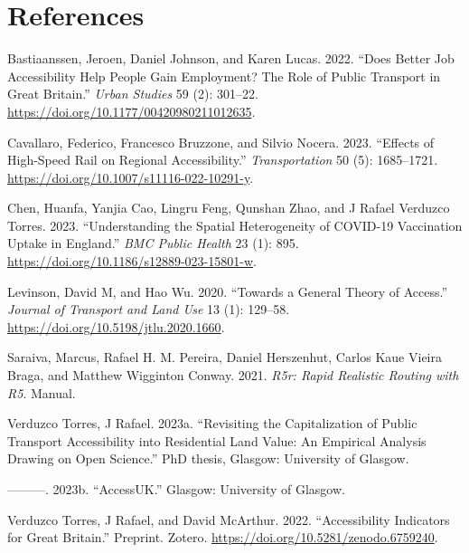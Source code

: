 \documentclass{article}
\newlength{\cslhangindent}
\newlength{\cslentryspacingunit} %
\newenvironment{CSLReferences}[2] %
 {%
  \setlength{\parindent}{0pt}
  \ifodd #1
  \let\oldpar\par
  \def\par{\hangindent=\cslhangindent\oldpar}
  \fi
  \setlength{\parskip}{#2\cslentryspacingunit}
 }%
 {}
\begin{document}
\hypertarget{references}{%
\section*{References}\label{references}}

\hypertarget{refs}{}
\begin{CSLReferences}{1}{0}
\leavevmode{}%
Bastiaanssen, Jeroen, Daniel Johnson, and Karen Lucas. 2022. {``Does
Better Job Accessibility Help People Gain Employment? {The} Role of
Public Transport in {Great Britain}.''} \emph{Urban Studies} 59 (2):
301--22. \url{https://doi.org/10.1177/00420980211012635}.

\leavevmode{}%
Cavallaro, Federico, Francesco Bruzzone, and Silvio Nocera. 2023.
{``Effects of High-Speed Rail on Regional Accessibility.''}
\emph{Transportation} 50 (5): 1685--1721.
\url{https://doi.org/10.1007/s11116-022-10291-y}.

\leavevmode{}%
Chen, Huanfa, Yanjia Cao, Lingru Feng, Qunshan Zhao, and J Rafael
Verduzco Torres. 2023. {``Understanding the Spatial Heterogeneity of
{COVID-19} Vaccination Uptake in {England}.''} \emph{BMC Public Health}
23 (1): 895. \url{https://doi.org/10.1186/s12889-023-15801-w}.

\leavevmode{}%
Levinson, David M, and Hao Wu. 2020. {``Towards a General Theory of
Access.''} \emph{Journal of Transport and Land Use} 13 (1): 129--58.
\url{https://doi.org/10.5198/jtlu.2020.1660}.

\leavevmode{}%
Saraiva, Marcus, Rafael H. M. Pereira, Daniel Herszenhut, Carlos Kaue
Vieira Braga, and Matthew Wigginton Conway. 2021. \emph{R5r: {Rapid}
Realistic Routing with {R5}}. Manual.

\leavevmode{}%
Verduzco Torres, J Rafael. 2023a. {``Revisiting the Capitalization of
Public Transport Accessibility into Residential Land Value: An Empirical
Analysis Drawing on {Open Science}.''} PhD thesis, {Glasgow}: University
of Glasgow.

\leavevmode{}%
---------. 2023b. {``{AccessUK}.''} {Glasgow}: University of Glasgow.

\leavevmode{}%
Verduzco Torres, J Rafael, and David McArthur. 2022. {``Accessibility
{Indicators} for {Great Britain}.''} Preprint. {Zotero}.
\url{https://doi.org/10.5281/zenodo.6759240}.

\end{CSLReferences}



\end{document}
